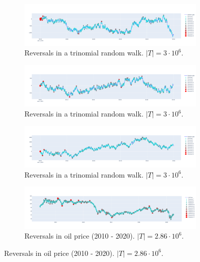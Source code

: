 \documentclass[../trend-calculus.tex]{subfiles}
\begin{document}
  
  \begin{figure}
    \centering
    \begin{subfigure}{\textwidth}
      \includegraphics[width=0.98\textwidth]{graphics/trinomial-rw1.png}
      \caption{Reversals in a trinomial random walk. $|T| = 3 \cdot 10^6$.}
    \end{subfigure}
    \begin{subfigure}{\textwidth}
      \includegraphics[width=0.98\textwidth]{graphics/trinomial-rw2.png}
      \caption{Reversals in a trinomial random walk. $|T| = 3 \cdot 10^6$.}
    \end{subfigure}
    \begin{subfigure}{\textwidth}
      \includegraphics[width=0.98\textwidth]{graphics/trinomial-rw3.png}
      \caption{Reversals in a trinomial random walk. $|T| = 3 \cdot 10^6$.}
    \end{subfigure}
    \begin{subfigure}{\textwidth}
      \includegraphics[width=0.98\textwidth]{graphics/tc-oil.png}
      \caption{Reversals in oil price (2010 - 2020). $|T| = 2.86 \cdot 10^6$.}
    \end{subfigure}

\end{figure}
\end{document}
